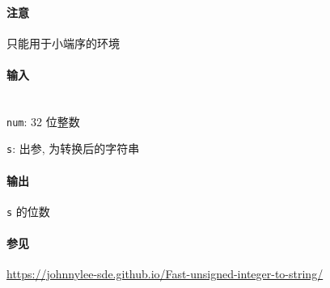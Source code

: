 \paragraph{注意}

只能用于小端序的环境

\paragraph{输入}~\\

\verb|num|: 32 位整数

\verb|s|: 出参, 为转换后的字符串

\paragraph{输出}

\verb|s| 的位数

\paragraph{参见}

\url{https://johnnylee-sde.github.io/Fast-unsigned-integer-to-string/}
